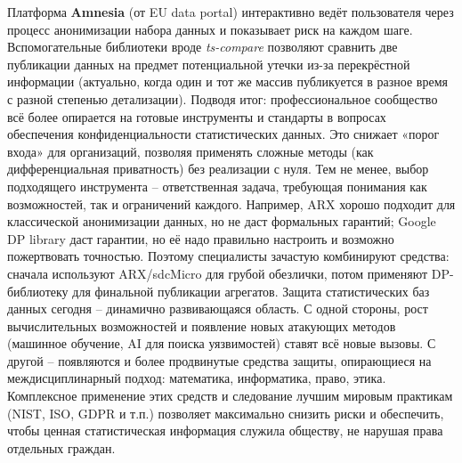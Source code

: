 Платформа \textbf{Amnesia} (от EU data portal) интерактивно ведёт пользователя через процесс анонимизации набора данных
и показывает риск на каждом шаге. Вспомогательные библиотеки вроде \textit{ts-compare} позволяют сравнить две публикации
данных на предмет потенциальной утечки из-за перекрёстной информации (актуально, когда один и тот же массив публикуется
в разное время с разной степенью детализации). Подводя итог: профессиональное сообщество всё более опирается на готовые
инструменты и стандарты в вопросах обеспечения конфиденциальности статистических данных. Это снижает «порог входа» для
организаций, позволяя применять сложные методы (как дифференциальная приватность) без реализации с нуля. Тем не менее,
выбор подходящего инструмента – ответственная задача, требующая понимания как возможностей, так и ограничений каждого.
Например, ARX хорошо подходит для классической анонимизации данных, но не даст формальных гарантий; Google DP library
даст гарантии, но её надо правильно настроить и возможно пожертвовать точностью. Поэтому специалисты зачастую
комбинируют средства: сначала используют ARX/sdcMicro для грубой обезлички, потом применяют DP-библиотеку для финальной
публикации агрегатов. Защита статистических баз данных сегодня – динамично развивающаяся область. С одной стороны, рост
вычислительных возможностей и появление новых атакующих методов (машинное обучение, AI для поиска уязвимостей) ставят
всё новые вызовы. С другой – появляются и более продвинутые средства защиты, опирающиеся на междисциплинарный подход:
математика, информатика, право, этика. Комплексное применение этих средств и следование лучшим мировым практикам (NIST,
ISO, GDPR и т.п.) позволяет максимально снизить риски и обеспечить, чтобы ценная статистическая информация служила
обществу, не нарушая права отдельных граждан.

